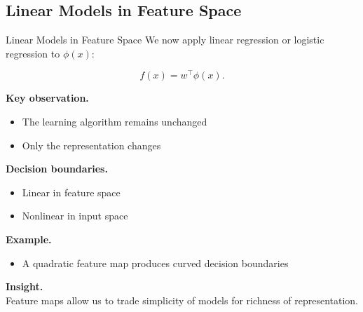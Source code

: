 \documentclass[aspectratio=169,11pt]{beamer}
\begin{document}
\subsection{Linear Models in Feature Space}
\begin{frame}[t,allowframebreaks]{Linear Models in Feature Space}
\small
We now apply linear regression or logistic regression to $\phi(x)$:

\[
f(x) = w^\top \phi(x).
\]

\textbf{Key observation.}\\ \begin{itemize}
    \item The learning algorithm remains unchanged
    \item Only the representation changes
\end{itemize}

\textbf{Decision boundaries.}\\ \begin{itemize}
    \item Linear in feature space
    \item Nonlinear in input space
\end{itemize}

\textbf{Example.}\\ \begin{itemize}
    \item A quadratic feature map produces curved decision boundaries
\end{itemize}

\textbf{Insight.}\\ Feature maps allow us to trade simplicity of models for richness of representation.
\end{frame}
\end{document}
